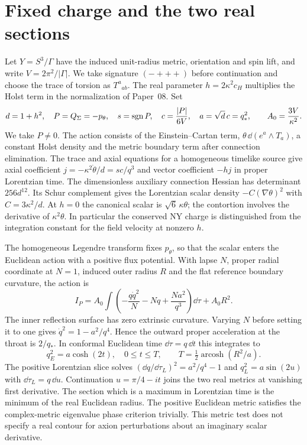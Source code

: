 \section{Fixed charge and the two real sections}\label{sec:background}
Let $Y=S^3/\Gamma$ have the induced unit-radius metric, orientation and spin lift, and write $V=2\pi^2/|\Gamma|$. We take signature $(-+++)$ before continuation and choose the trace of torsion as $T^a{}_{ab}$. The real parameter $h=2\kappa^2 c_H$ multiplies the Holst term in the normalization of Paper~08. Set
\begin{equation}
 d=1+h^2,\quad P=Q_\Sigma=-p_\theta,\quad s=\operatorname{sgn} P,\quad c=\frac{|P|}{6V},\quad
 a=\sqrt d\,c=q_*^2,\qquad A_0=\frac{3V}{\kappa^2}.
 \label{eq:scales}
\end{equation}
We take $P\ne0$. The action consists of the Einstein--Cartan term, $\theta\,\dd(e^a\wedge T_a)$, a constant Holst density and the metric boundary term after connection elimination. The trace and axial equations for a homogeneous timelike source give axial coefficient $j=-\kappa^2\dot\theta/d=s c/q^3$ and vector coefficient $-hj$ in proper Lorentzian time. The dimensionless auxiliary connection Hessian has determinant $256d^{12}$. Its Schur complement gives the Lorentzian scalar density $-C(\nabla\theta)^2$ with $C=3\kappa^2/d$. At $h=0$ the canonical scalar is $\sqrt6\,\kappa\theta$; the contortion involves the derivative of $\kappa^2\theta$. In particular the conserved NY charge is distinguished from the integration constant for the field velocity at nonzero $h$.

The homogeneous Legendre transform fixes $p_\theta$, so that the scalar enters the Euclidean action with a positive flux potential. With lapse $N$, proper radial coordinate at $N=1$, induced outer radius $R$ and the flat reference boundary curvature, the action is
\begin{equation}
 I_P=A_0\int\left(-\frac{q\dot q^2}{N}-Nq+\frac{Na^2}{q^3}\right)\dd\tau+A_0 R^2 .
 \label{eq:action}
\end{equation}
The inner reflection surface has zero extrinsic curvature. Varying $N$ before setting it to one gives $\dot q^2=1-a^2/q^4$. Hence the outward proper acceleration at the throat is $2/q_*$. In conformal Euclidean time $\dd\tau=q\,\dd t$ this integrates to
\begin{equation}
 q_E^2=a\cosh(2t),\quad 0\le t\le T,\qquad
 T=\tfrac12\operatorname{arcosh}(R^2/a).
 \label{eq:q}
\end{equation}
The positive Lorentzian slice solves $(\dd q/\dd\tau_L)^2=a^2/q^4-1$ and $q_L^2=a\sin(2u)$ with $\dd\tau_L=q\,\dd u$. Continuation $u=\pi/4-it$ joins the two real metrics at vanishing first derivative. The section which is a maximum in Lorentzian time is the minimum of the real Euclidean radius. The positive Euclidean metric satisfies the complex-metric eigenvalue phase criterion trivially. This metric test does not specify a real contour for axion perturbations about an imaginary scalar derivative.


